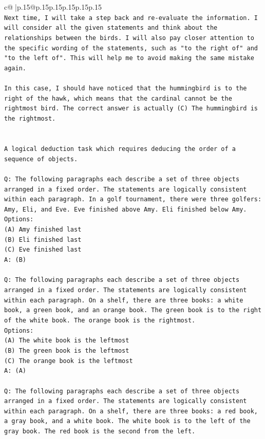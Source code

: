\documentclass{article}
\begin{document}
{\begin{supertabular}{c@{$\;$}|p{.15\linewidth}@{}p{.15\linewidth}p{.15\linewidth}p{.15\linewidth}p{.15\linewidth}p{.15\linewidth}}
{{{\\ 
\texttt{Next time, I will take a step back and re{-}evaluate the information. I will consider all the given statements and think about the relationships between the birds. I will also pay closer attention to the specific wording of the statements, such as "to the right of" and "to the left of". This will help me to avoid making the same mistake again. } \\
\\ 
\texttt{In this case, I should have noticed that the hummingbird is to the right of the hawk, which means that the cardinal cannot be the rightmost bird. The correct answer is actually (C) The hummingbird is the rightmost.} \\
\\ 
\\ 
\texttt{A logical deduction task which requires deducing the order of a sequence of objects.} \\
\\ 
\texttt{Q: The following paragraphs each describe a set of three objects arranged in a fixed order. The statements are logically consistent within each paragraph. In a golf tournament, there were three golfers: Amy, Eli, and Eve. Eve finished above Amy. Eli finished below Amy.} \\
\texttt{Options:} \\
\texttt{(A) Amy finished last} \\
\texttt{(B) Eli finished last} \\
\texttt{(C) Eve finished last} \\
\texttt{A: (B)} \\
\\ 
\texttt{Q: The following paragraphs each describe a set of three objects arranged in a fixed order. The statements are logically consistent within each paragraph. On a shelf, there are three books: a white book, a green book, and an orange book. The green book is to the right of the white book. The orange book is the rightmost.} \\
\texttt{Options:} \\
\texttt{(A) The white book is the leftmost} \\
\texttt{(B) The green book is the leftmost} \\
\texttt{(C) The orange book is the leftmost} \\
\texttt{A: (A)} \\
\\ 
\texttt{Q: The following paragraphs each describe a set of three objects arranged in a fixed order. The statements are logically consistent within each paragraph. On a shelf, there are three books: a red book, a gray book, and a white book. The white book is to the left of the gray book. The red book is the second from the left.} \\
}}}
\end{supertabular}}
\end{document}
